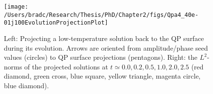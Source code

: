 \documentclass[../PhD.tex]{subfiles}
\begin{document}

\begin{figure}[ht]
	\centering
	\texttt{[image: /Users/bradc/Research/Thesis/PhD/Chapter2/figs/Qpa4\_40e-01j100EvolutionProjectionPlot]}
	\caption[Taking the spectrum of a QP solution during evolution to use as a seed to find new QP solutions]{Left: Projecting a low-temperature solution back to the QP surface during its evolution. Arrows are oriented from amplitude/phase seed values (circles) to QP surface projections (pentagons). Right: the $L^2$-norms of the projected solutions at $t\simeq 0.0, 0.2, 0.5, 1.0, 2.0, 2.5$ (red diamond, green cross, blue square, yellow triangle, magenta circle, blue diamond).}
	\label{fig: Qpa4_40e-01j100EvolutionProjection}
\end{figure}

\end{document}
